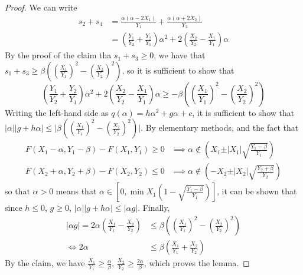 \documentclass{article}
\theoremstyle{case}
\begin{document}
\begin{proof}
We can write
\begin{align*}
s_2 + s_4 & = \frac{\alpha \left( \alpha - 2X_1\right)}{Y_1}  + \frac{\alpha\left( \alpha + 2X_2\right)}{Y_2} \\
& = \left( \frac{Y_1}{Y_2} + \frac{Y_2}{Y_1}\right)\alpha^2 + 2\left( \frac{X_2}{Y_2} - \frac{X_1}{Y_1} \right)\alpha
\end{align*}
By the proof of the claim tha $s_1 + s_3 \geq 0$, we have that $s_1 + s_3 \geq \beta \left( \left( \frac{X_1}{Y_1}\right)^2 - \left( \frac{X_2}{Y_2}\right)^2 \right)$, so it is sufficient to show that
\[
\left( \frac{Y_1}{Y_2} + \frac{Y_2}{Y_1}\right)\alpha^2 + 2\left( \frac{X_2}{Y_2} - \frac{X_1}{Y_1} \right)\alpha \geq  - \beta\left( \left( \frac{X_1}{Y_1}\right)^2 - \left( \frac{X_2}{Y_2}\right)^2 \right)
\]
Writing the left-hand side as $q\left( \alpha \right) = h\alpha^2 + g\alpha + c$, it is sufficient to show that $\vert \alpha\vert \vert g + h \alpha\vert \leq \vert \beta\left( \left( \frac{X_1}{Y_1}\right)^2 - \left( \frac{X_2}{Y_2}\right)^2 \right) \vert$. By elementary methods, and the fact that 
\begin{align*}
F(X_1-\alpha, Y_1-\beta) - F(X_1, Y_1) \geq 0 & \implies \alpha \not \in \left( X_1 \pm \vert X_1\vert \sqrt{\frac{Y_1-\beta}{Y_1}}\right) \\
F(X_2+\alpha, Y_2+\beta) - F(X_2, Y_2) \leq 0 & \implies \alpha \not \in \left( -X_2 \pm \vert X_2\vert \sqrt{\frac{Y_2 +\beta}{Y_2}} \right)
\end{align*}
so that $\alpha > 0$ means that $\alpha \in \left[ 0, \min{X_1\left( 1 - \sqrt{\frac{Y_1-\beta}{Y_1}}\right)}\right]$, it can be shown that since $h \leq 0$, $g \geq 0$, $\vert \alpha\vert \vert g + h \alpha\vert \leq \vert \alpha g \vert$. Finally,
\begin{align*}
\vert \alpha g \vert = 2\alpha\left( \frac{X_1}{Y_1} - \frac{X_2}{Y_2}\right) & \leq \beta\left( \left(\frac{X_1}{Y_1}\right)^2 - \left(\frac{X_2}{Y_2}\right)^2\right) \\
\iff 2\alpha & \leq \beta\left( \frac{X_1}{Y_1} + \frac{X_2}{Y_2}\right)
\end{align*}
By the claim, we have $\frac{X_1}{Y_1} \geq \frac{\alpha}{\beta}$, $\frac{X_2}{Y_2} \geq \frac{2\alpha}{\beta}$, which proves the lemma.

\end{proof}
\end{document}
